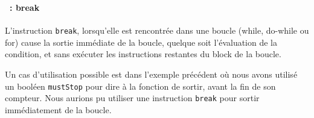 \begin{frame}[containsverbatim]
  \frametitle{\secname}
  \framesubtitle{\subsecname~: break}

  L'instruction \verb|break|, lorsqu'elle est rencontrée dans une boucle (while, do-while ou for) cause la sortie immédiate de la boucle, quelque soit l'évaluation 
  de la condition, et sans exécuter les instructions restantes du block de la boucle.
  \vspace{0.5cm}
  \par
  Un cas d'utilisation possible est dans l'exemple précédent où nous avons utilisé un booléen \verb|mustStop| pour dire à la fonction de sortir, avant la fin de 
  son compteur. Nous aurions pu utiliser une instruction \verb|break| pour sortir immédiatement de la boucle.
\end{frame}

